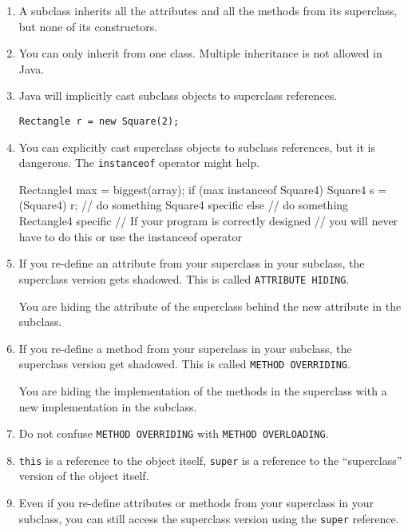 \documentclass[a4paper, 9pt]{extarticle}
\begin{document}
\begin{enumerate}

  \item A subclass inherits all the attributes and all the methods from its
    superclass, but none of its constructors.

  \item You can only inherit from one class. Multiple inheritance is not
    allowed in Java.

  \item Java will implicitly cast subclass objects to superclass references.

    \verb+Rectangle r = new Square(2);+

  \item You can explicitly cast superclass objects to subclass references, but
    it is dangerous. The \verb+instanceof+ operator might help.

\begin{blackboard}
Rectangle4 max = biggest(array);
if (max instanceof Square4) {
  Square4 s = (Square4) r;
  // do something Square4 specific
} else {
  // do something Rectangle4 specific
}
// If your program is correctly designed
// you will never have to do this or use the instanceof operator
\end{blackboard}

  \item If you re-define an attribute from your superclass in your subclass,
    the superclass version gets shadowed. This is called \verb+ATTRIBUTE HIDING+.

    You are hiding the attribute of the
    superclass behind the new attribute in the subclass.

  \item If you re-define a method from your superclass in your subclass, the
    superclass version get shadowed. This is called \verb+METHOD OVERRIDING+.

    You are hiding the implementation of the methods in the superclass with a
    new implementation in the subclass.

  \item Do not confuse \verb+METHOD OVERRIDING+ with \verb+METHOD OVERLOADING+.

  \item \verb+this+ is a reference to the object itself, \verb+super+ is a
    reference to the ``superclass'' version of the object itself.

  \item Even if you re-define attributes or methods from your superclass in
    your subclass, you can still access the superclass version using the
    \verb+super+ reference.


\end{enumerate}
\end{document}
